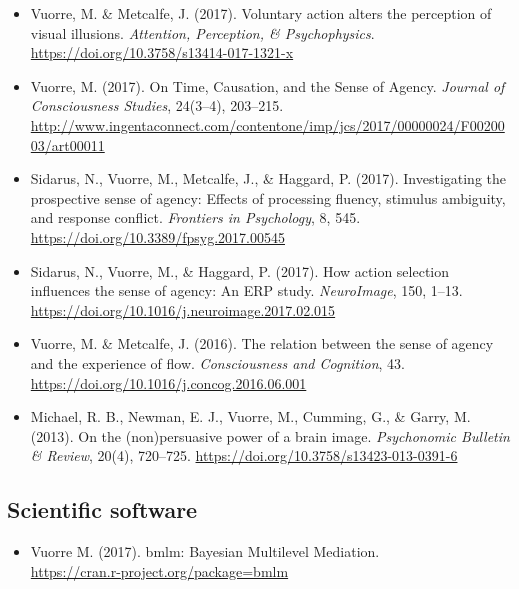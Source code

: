 \documentclass[12pt, a4paper]{article}
\newcommand{\years}[1]{\marginnote{\scriptsize #1}}
\begin{document}
\begin{itemize}[label={},itemindent=-1em,leftmargin=1em,itemsep=0em]
\item Vuorre, M. \& Metcalfe, J. (2017). Voluntary action alters the perception of visual illusions. \emph{Attention, Perception, \& Psychophysics}. \url{https://doi.org/10.3758/s13414-017-1321-x}
\item Vuorre, M. (2017). On Time, Causation, and the Sense of Agency. \emph{Journal of Consciousness Studies}, 24(3–4), 203–215. \url{http://www.ingentaconnect.com/contentone/imp/jcs/2017/00000024/F0020003/art00011}
\item Sidarus, N., Vuorre, M., Metcalfe, J., \& Haggard, P. (2017). Investigating the prospective sense of agency: Effects of processing fluency, stimulus ambiguity, and response conflict. \emph{Frontiers in Psychology}, 8, 545. \url{https://doi.org/10.3389/fpsyg.2017.00545}
\item Sidarus, N., Vuorre, M., \& Haggard, P. (2017). How action selection influences the sense of agency: An ERP study. \emph{NeuroImage}, 150, 1–13. \url{https://doi.org/10.1016/j.neuroimage.2017.02.015}
\item \years{2016} Vuorre, M. \& Metcalfe, J. (2016). The relation between the sense of agency and the experience of flow. \emph{Consciousness and Cognition}, 43. \url{https://doi.org/10.1016/j.concog.2016.06.001}
\item \years{2013} Michael, R. B., Newman, E. J., Vuorre, M., Cumming, G., \& Garry, M. (2013). On the (non)persuasive power of a brain image. \emph{Psychonomic Bulletin \& Review}, 20(4), 720–725. \url{https://doi.org/10.3758/s13423-013-0391-6}
\end{itemize}

\subsection*{Scientific software}
\begin{itemize}
\item \years{2017} Vuorre M. (2017). bmlm: Bayesian Multilevel Mediation. \\ \url{https://cran.r-project.org/package=bmlm}
\end{itemize}
\end{document}
